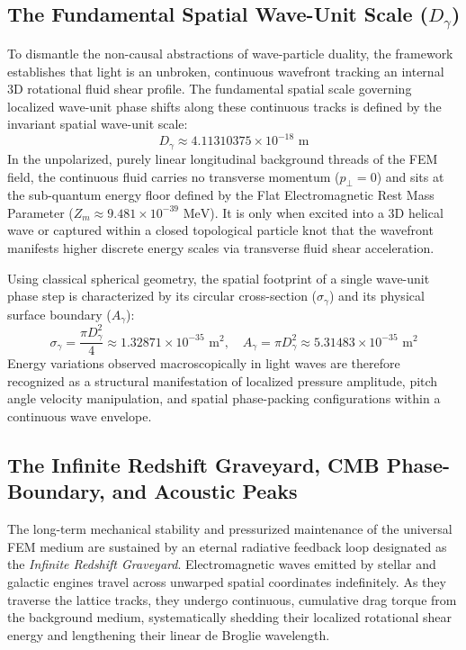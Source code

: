 \documentclass[11pt,a4paper]{article}
\begin{document}
	\subsection{\texorpdfstring{The Fundamental Spatial Wave-Unit Scale ($D_\gamma$)}{The Fundamental Spatial Wave-Unit Scale (D\_gamma)}}
	To dismantle the non-causal abstractions of wave-particle duality, the framework establishes that light is an unbroken, continuous wavefront tracking an internal 3D rotational fluid shear profile. The fundamental spatial scale governing localized wave-unit phase shifts along these continuous tracks is defined by the invariant spatial wave-unit scale:
	\begin{equation}
		D_\gamma \approx 4.11310375 \times 10^{-18}\text{ m}
	\end{equation}
	In the unpolarized, purely linear longitudinal background threads of the FEM field, the continuous fluid carries no transverse momentum ($p_\perp = 0$) and sits at the sub-quantum energy floor defined by the Flat Electromagnetic Rest Mass Parameter ($Z_m \approx 9.481 \times 10^{-39}\text{ MeV}$). It is only when excited into a 3D helical wave or captured within a closed topological particle knot that the wavefront manifests higher discrete energy scales via transverse fluid shear acceleration.
	
	Using classical spherical geometry, the spatial footprint of a single wave-unit phase step is characterized by its circular cross-section ($\sigma_{\gamma}$) and its physical surface boundary ($A_{\gamma}$):
	\begin{equation}
		\sigma_{\gamma} = \frac{\pi D_{\gamma}^2}{4} \approx 1.32871 \times 10^{-35} \text{ m}^2, \quad A_{\gamma} = \pi D_{\gamma}^2 \approx 5.31483 \times 10^{-35} \text{ m}^2
	\end{equation}
	Energy variations observed macroscopically in light waves are therefore recognized as a structural manifestation of localized pressure amplitude, pitch angle velocity manipulation, and spatial phase-packing configurations within a continuous wave envelope.
	
	\subsection{The Infinite Redshift Graveyard, CMB Phase-Boundary, and Acoustic Peaks}
	The long-term mechanical stability and pressurized maintenance of the universal FEM medium are sustained by an eternal radiative feedback loop designated as the \textit{Infinite Redshift Graveyard}. Electromagnetic waves emitted by stellar and galactic engines travel across unwarped spatial coordinates indefinitely. As they traverse the lattice tracks, they undergo continuous, cumulative drag torque from the background medium, systematically shedding their localized rotational shear energy and lengthening their linear de Broglie wavelength.
	
\end{document}
